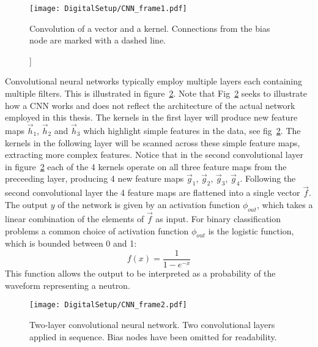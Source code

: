 \documentclass[main.tex]{subfiles}
\begin{document}
\begin{figure}[ht!]
    \centering
        \texttt{[image: DigitalSetup/CNN\_frame1.pdf]}
        \caption[Convolution of a vector and a kernel]]{Convolution of a vector and a kernel. Connections from the bias node are marked with a dashed line.}
    \label{fig:CNN_frame1} 
\end{figure}

Convolutional neural networks typically employ multiple layers each containing multiple filters. This is illustrated in figure~\ref{fig:CNN_frame2}. Note that Fig~\ref{fig:CNN_frame2} seeks to illustrate how a CNN works and does not reflect the architecture of the actual network employed in this thesis.  The kernels in the first layer will produce new feature maps $\vec h_1$, $\vec h_2$ and $\vec h_3$ which highlight simple features in the data, see fig~\ref{fig:CNN_frame2}. The kernels in the following layer will be scanned across these simple feature maps, extracting more complex features. Notice that in the second convolutional layer in figure~\ref{fig:CNN_frame2} each of the 4 kernels operate on all three feature maps from the preceeding layer, producing 4 new feature maps $\vec g_1$, $\vec g_2$, $\vec g_3$, $\vec g_4$. Following the second convolutional layer the 4 feature maps are flattened into a single vector $\vec f$. The output $y$ of the network is given by an activation function $\phi_{out}$, which takes a linear combination of the elements of $\vec f$ as input. For binary classification problems a common choice of activation function $\phi_{out}$ is the logistic function, which is bounded between 0 and 1:
\begin{equation}
	f(x) = \frac{1}{1-e^{-x}}
\end{equation}
This function allows the output to be interpreted as a probability of the waveform representing a neutron.

\begin{figure}[ht!]
    \centering
        \texttt{[image: DigitalSetup/CNN\_frame2.pdf]}
        \caption[Two-layer convolutional neural network.]{Two-layer convolutional neural network. Two convolutional layers applied in sequence. Bias nodes have been omitted for readability.}
    \label{fig:CNN_frame2} 
\end{figure}
\end{document}
